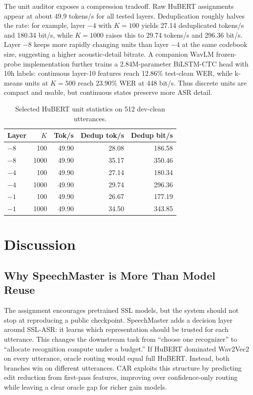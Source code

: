 \documentclass{article}
\begin{document}
The unit auditor exposes a compression tradeoff. Raw HuBERT assignments appear
at about 49.9 tokens/s for all tested layers. Deduplication roughly halves the
rate: for example, layer $-4$ with $K=100$ yields 27.14 deduplicated tokens/s
and 180.34 bit/s, while $K=1000$ raises this to 29.74 tokens/s and
296.36 bit/s. Layer $-8$ keeps more rapidly changing units than layer $-4$ at
the same codebook size, suggesting a higher acoustic-detail bitrate. A companion
WavLM frozen-probe implementation further trains a 2.84M-parameter BiLSTM-CTC
head with 10h labels: continuous layer-10 features reach 12.86\% test-clean WER,
while k-means units at $K=500$ reach 23.90\% WER at 448 bit/s. Thus discrete
units are compact and usable, but continuous states preserve more ASR detail.

\begin{table}[t]
\centering
\caption{Selected HuBERT unit statistics on 512 dev-clean utterances.}
\label{tab:units}
\small
\begin{tabular}{lrrrr}
\toprule
Layer & $K$ & Tok/s & Dedup tok/s & Dedup bit/s\\
\midrule
$-8$ & 100 & 49.90 & 28.08 & 186.58\\
$-8$ & 1000 & 49.90 & 35.17 & 350.46\\
$-4$ & 100 & 49.90 & 27.14 & 180.34\\
$-4$ & 1000 & 49.90 & 29.74 & 296.36\\
$-1$ & 100 & 49.90 & 26.67 & 177.19\\
$-1$ & 1000 & 49.90 & 34.50 & 343.85\\
\bottomrule
\end{tabular}
\end{table}

\section{Discussion}

\subsection{Why SpeechMaster is More Than Model Reuse}

The assignment encourages pretrained SSL models, but the system should not stop
at reproducing a public checkpoint. SpeechMaster adds a decision layer around
SSL-ASR: it learns which representation should be trusted for each utterance.
This changes the downstream task from ``choose one recognizer'' to ``allocate
recognition compute under a budget.'' If HuBERT dominated Wav2Vec2 on every
utterance, oracle routing would equal full HuBERT. Instead, both branches win on
different utterances. CAR exploits this structure by predicting edit reduction
from first-pass features, improving over confidence-only routing while leaving a
clear oracle gap for richer gain models.
\end{document}
